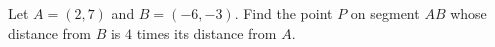 Let $A=(2,7)$ and $B=(-6,-3)$. Find the point $P$ on segment $AB$ whose distance from $B$ is $4$ times its distance from $A$.
